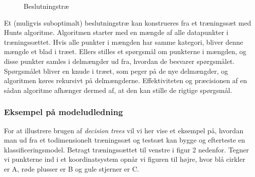 \documentclass{article}
\begin{document}
\begin{figure}[H]
\begin{center}
\end{center}
\caption{Beslutningstræ}
\end{figure}

Et (muligvis suboptimalt) beslutningstræ kan konstrueres fra et træningssæt med Hunts algoritme. Algoritmen starter med en mængde af alle datapunkter i træningssættet. Hvis alle punkter i mængden har samme kategori, bliver denne mængde et blad i træet. Ellers stilles et spørgsmål om punkterne i mængden, og disse punkter samles i delmængder ud fra, hvordan de besvarer spørgsmålet. Spørgsmålet bliver en knude i træet, som peger på de nye delmængder, og algoritmen køres rekursivt på delmængderne. Effektiviteten og præcisionen af en sådan algoritme afhænger dermed af, at den kan stille de rigtige spørgsmål.


\subsubsection{Eksempel på modeludledning}
For at illustrere brugen af \textit{decision trees} vil vi her vise et eksempel på, hvordan man ud fra et todimensionelt træningssæt og testsæt kan bygge og efterteste en klassificeringsmodel. Betragt træningssættet til venstre i figur 2 nedenfor. Tegner vi punkterne ind i et koordinatsystem opnår vi figuren til højre, hvor blå cirkler er A, røde plusser er B og gule stjerner er C.
\end{document}
